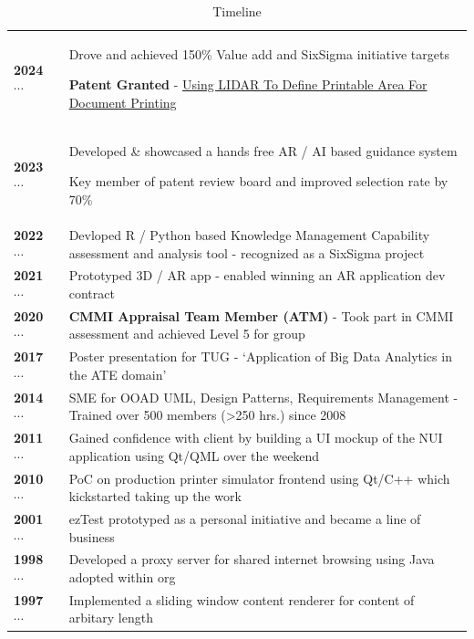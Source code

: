 \documentclass[a4paper,12pt]{article}
\newcommand\cvte[2]{\footnotesize{\textbf{#1}} ~$\cdots$~ & \footnotesize{#2}}
\begin{document}
\begin{table}
  \caption*{Timeline}
  \begin{tabular}{l|p{4cm}}
    \hline
    \cvte{2024}{Drove and achieved 150\% Value add and SixSigma initiative targets} \par \textbf{Patent Granted} - \href{https://patents.justia.com/patent/20240281181}{Using LIDAR To Define Printable Area For Document Printing} \\
    \cvte{2023}{Developed \& showcased a hands free AR / AI based guidance system \par Key member of patent review board and improved selection rate by 70\% } \\
    \cvte{2022}{Devloped R / Python based  Knowledge Management Capability assessment and analysis tool - recognized as a SixSigma project} \\
    \cvte{2021}{Prototyped 3D / AR app - enabled winning an AR application dev contract} \\
    \cvte{2020}{\textbf{CMMI Appraisal Team Member (ATM)} - Took part in CMMI assessment and achieved Level 5 for group} \\
    \cvte{2017}{Poster presentation for TUG - `Application of Big Data Analytics in the ATE domain'} \\
    \cvte{2014}{SME for OOAD UML, Design Patterns, Requirements Management - Trained over 500 members (>250 hrs.) since 2008} \\
    \cvte{2011}{Gained confidence with client by building a UI mockup of the NUI application using Qt/QML over the weekend} \\
    \cvte{2010}{PoC on production printer simulator frontend using Qt/C++ which kickstarted taking up the work} \\
    \cvte{2001}{ezTest prototyped as a personal initiative and became a line of business} \\
    \cvte{1998}{Developed a proxy server for shared internet browsing using Java adopted within org} \\
    \cvte{1997}{Implemented a sliding window content renderer for content of arbitary length} \\
    \hline
  \end{tabular}
\end{table}
\end{document}

